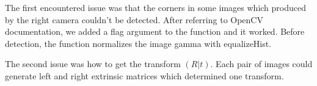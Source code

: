 \documentclass{article}
\begin{document}
\begin{enumerate}[resume]
The first encountered issue was that the corners in some images which produced by the right camera couldn't be detected. After referring to OpenCV documentation, we added a flag argument to the function and it worked. Before detection, the function normalizes the image gamma with equalizeHist.

The second issue was how to get the transform $(R | t)$. Each pair of images could generate left and right extrinsic matrices which determined one transform.
\end{enumerate}

\printbibliography[
heading=bibintoc,
title = {References}
]
\end{document}
